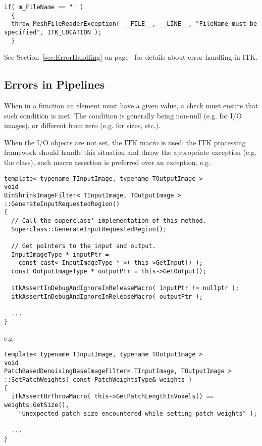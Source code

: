 \small
\begin{verbatim}
if( m_FileName == "" )
  {
  throw MeshFileReaderException( __FILE__, __LINE__, "FileName must be specified", ITK_LOCATION );
  }
\end{verbatim}
\normalsize

See Section~\ref{sec:ErrorHandling} on page~\pageref{sec:ErrorHandling} for
details about error handling in ITK.


\subsection{Errors in Pipelines}
\label{subsec:ErrorsInPipelines}

When in a function an element must have a given value, a check must ensure that
such condition is met. The condition is generally being non-null (e.g. for I/O
images), or different from zero (e.g. for sizes, etc.).

When the I/O objects are not set, the ITK
 macro is used: the ITK processing
framework should handle this situation and throw the appropriate exception (e.g.
the  class), such macro assertion is preferred over
an exception, e.g.

\small
\begin{verbatim}
template< typename TInputImage, typename TOutputImage >
void
BinShrinkImageFilter< TInputImage, TOutputImage >
::GenerateInputRequestedRegion()
{
  // Call the superclass' implementation of this method.
  Superclass::GenerateInputRequestedRegion();

  // Get pointers to the input and output.
  InputImageType * inputPtr =
    const_cast< InputImageType * >( this->GetInput() );
  const OutputImageType * outputPtr = this->GetOutput();

  itkAssertInDebugAndIgnoreInReleaseMacro( inputPtr != nullptr );
  itkAssertInDebugAndIgnoreInReleaseMacro( outputPtr );

  ...
}
\end{verbatim}
\normalsize

e.g

\small
\begin{verbatim}
template< typename TInputImage, typename TOutputImage >
void
PatchBasedDenoisingBaseImageFilter< TInputImage, TOutputImage >
::SetPatchWeights( const PatchWeightsType& weights )
{
  itkAssertOrThrowMacro( this->GetPatchLengthInVoxels() == weights.GetSize(),
    "Unexpected patch size encountered while setting patch weights" );

  ...
}
\end{verbatim}
\normalsize

